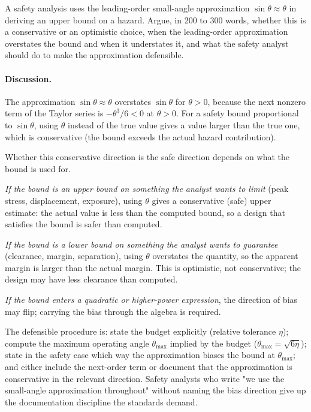 \begin{exercise}
A safety analysis uses the leading-order small-angle approximation
$\sin \theta \approx \theta$ in deriving an upper bound on a hazard.
Argue, in 200 to 300 words, whether this is a conservative or an
optimistic choice, when the leading-order approximation overstates
the bound and when it understates it, and what the safety analyst
should do to make the approximation defensible.

\paragraph{Discussion.} The approximation $\sin\theta \approx \theta$
overstates $\sin\theta$ for $\theta > 0$, because the next nonzero
term of the Taylor series is $-\theta^{3}/6 < 0$ at $\theta > 0$.
For a safety bound proportional to $\sin\theta$, using $\theta$
instead of the true value gives a value larger than the true one,
which is conservative (the bound exceeds the actual hazard
contribution).

Whether this conservative direction is the safe direction depends on
what the bound is used for.

\textit{If the bound is an upper bound on something the analyst
wants to limit} (peak stress, displacement, exposure), using
$\theta$ gives a conservative (safe) upper estimate: the actual
value is less than the computed bound, so a design that satisfies
the bound is safer than computed.

\textit{If the bound is a lower bound on something the analyst
wants to guarantee} (clearance, margin, separation), using $\theta$
overstates the quantity, so the apparent margin is larger than the
actual margin. This is optimistic, not conservative; the design may
have less clearance than computed.

\textit{If the bound enters a quadratic or higher-power
expression}, the direction of bias may flip; carrying the bias
through the algebra is required.

The defensible procedure is: state the budget explicitly (relative
tolerance $\eta$); compute the maximum operating angle
$\theta_{\max}$ implied by the budget ($\theta_{\max} = \sqrt{6
\eta}$); state in the safety case which way the approximation
biases the bound at $\theta_{\max}$; and either include the
next-order term or document that the approximation is conservative
in the relevant direction. Safety analysts who write "we use the
small-angle approximation throughout" without naming the bias
direction give up the documentation discipline the standards
demand.
\end{exercise}

